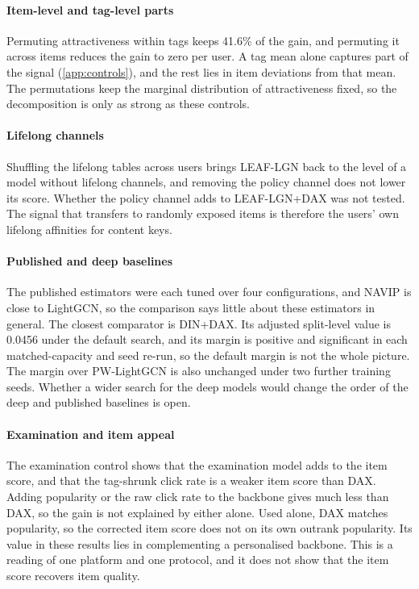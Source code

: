 \documentclass[preprint,12pt,authoryear]{elsarticle}
\begin{document}
\paragraph{Item-level and tag-level parts} Permuting attractiveness within tags keeps 41.6\% of the gain, and permuting it across items reduces the gain to zero per user. A tag mean alone captures part of the signal (\ref{app:controls}), and the rest lies in item deviations from that
mean. The permutations keep the marginal distribution of attractiveness fixed, so the decomposition is only as strong as these controls.

\paragraph{Lifelong channels} Shuffling the lifelong tables across users brings LEAF-LGN back to the level of a model without lifelong channels, and removing the policy channel
does not lower its score. Whether the policy channel adds to LEAF-LGN+DAX was not tested. The signal that transfers to randomly exposed items
is therefore the users' own lifelong affinities for content keys.

\paragraph{Published and deep baselines} The published estimators were each tuned over four configurations, and NAVIP is close to LightGCN, so
the comparison says little about these estimators in general. The closest comparator is DIN+DAX. Its adjusted split-level value is 0.0456 under the default search, and its margin is positive and significant in each matched-capacity and seed re-run, so the default margin is not the whole picture. The margin over PW-LightGCN is also unchanged under two further training seeds.
Whether a wider search for the deep models would change the order of the deep and published baselines is open.

\paragraph{Examination and item appeal} The examination control shows that the examination model adds to the item score, and that the
tag-shrunk click rate is a weaker item score than DAX. Adding popularity or the raw click rate to the backbone gives much less than DAX, so the gain is not explained by either alone. Used alone, DAX matches popularity, so the corrected item score does not on its own
outrank popularity. Its value in these results lies in complementing a personalised backbone. This is a reading of one platform
and one protocol, and it does not show that the item score recovers item quality.
\end{document}
